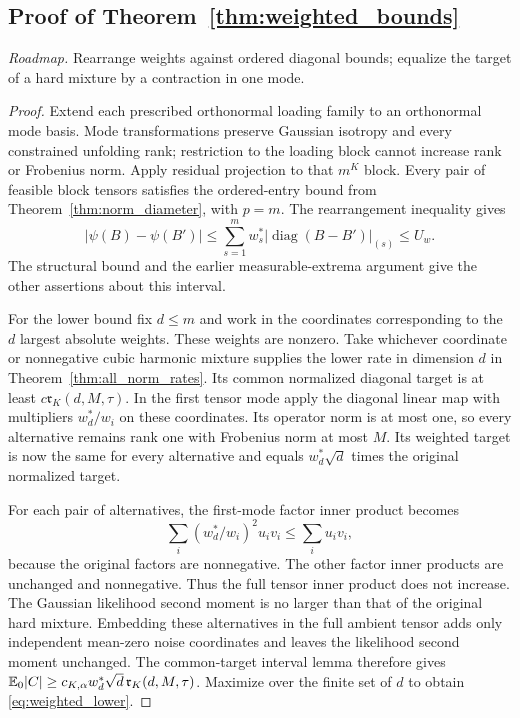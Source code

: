 \subsection{Proof of Theorem~\ref{thm:weighted_bounds}}
\noindent\emph{Roadmap.} Rearrange weights against ordered diagonal bounds; equalize the target of a hard mixture by a contraction in one mode.
\begin{proof}
Extend each prescribed orthonormal loading family to an orthonormal mode basis. Mode transformations preserve Gaussian isotropy and every constrained unfolding rank; restriction to the loading block cannot increase rank or Frobenius norm. Apply residual projection to that $m^K$ block. Every pair of feasible block tensors satisfies the ordered-entry bound from Theorem~\ref{thm:norm_diameter}, with $p=m$. The rearrangement inequality gives
\[
 |\psi(B)-\psi(B')|
 \le\sum_{s=1}^m w_s^*|\operatorname{diag}(B-B')|_{(s)}\le U_w.
\]
The structural bound and the earlier measurable-extrema argument give the other assertions about this interval.

For the lower bound fix $d\le m$ and work in the coordinates corresponding to the $d$ largest absolute weights. These weights are nonzero. Take whichever coordinate or nonnegative cubic harmonic mixture supplies the lower rate in dimension $d$ in Theorem~\ref{thm:all_norm_rates}. Its common normalized diagonal target is at least $c\mathfrak r_K(d,M,\tau)$. In the first tensor mode apply the diagonal linear map with multipliers $w_d^*/w_i$ on these coordinates. Its operator norm is at most one, so every alternative remains rank one with Frobenius norm at most $M$. Its weighted target is now the same for every alternative and equals $w_d^*\sqrt d$ times the original normalized target.

For each pair of alternatives, the first-mode factor inner product becomes
\[
 \sum_i (w_d^*/w_i)^2 u_i v_i\le\sum_i u_i v_i,
\]
because the original factors are nonnegative. The other factor inner products are unchanged and nonnegative. Thus the full tensor inner product does not increase. The Gaussian likelihood second moment is no larger than that of the original hard mixture. Embedding these alternatives in the full ambient tensor adds only independent mean-zero noise coordinates and leaves the likelihood second moment unchanged. The common-target interval lemma therefore gives
$\mathbb E_0|C|\ge c_{K,\alpha}w_d^*\sqrt d\,\mathfrak r_K(d,M,\tau)$.
Maximize over the finite set of $d$ to obtain \eqref{eq:weighted_lower}.
\end{proof}

